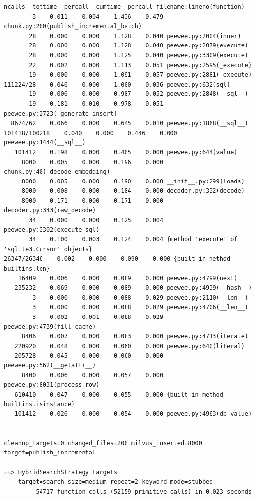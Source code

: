 \documentclass[a4paper,12pt]{article}
\begin{document}
\begin{lstlisting}[basicstyle=\ttfamily\fontsize{9}{9}\selectfont]
   ncalls  tottime  percall  cumtime  percall filename:lineno(function)
        3    0.011    0.004    1.436    0.479 chunk.py:200(publish_incremental_batch)
       28    0.000    0.000    1.128    0.040 peewee.py:2004(inner)
       28    0.000    0.000    1.128    0.040 peewee.py:2079(execute)
       28    0.000    0.000    1.125    0.040 peewee.py:3309(execute)
       22    0.002    0.000    1.113    0.051 peewee.py:2595(_execute)
       19    0.000    0.000    1.091    0.057 peewee.py:2881(_execute)
111224/28    0.046    0.000    1.000    0.036 peewee.py:632(sql)
       19    0.006    0.000    0.987    0.052 peewee.py:2848(__sql__)
       19    0.181    0.010    0.978    0.051 peewee.py:2723(_generate_insert)
  8674/62    0.066    0.000    0.645    0.010 peewee.py:1868(__sql__)
101418/100218    0.040    0.000    0.446    0.000 peewee.py:1444(__sql__)
   101412    0.198    0.000    0.405    0.000 peewee.py:644(value)
     8000    0.005    0.000    0.196    0.000 chunk.py:40(_decode_embedding)
     8000    0.005    0.000    0.190    0.000 __init__.py:299(loads)
     8000    0.008    0.000    0.184    0.000 decoder.py:332(decode)
     8000    0.171    0.000    0.171    0.000 decoder.py:343(raw_decode)
       34    0.000    0.000    0.125    0.004 peewee.py:3302(execute_sql)
       34    0.100    0.003    0.124    0.004 {method 'execute' of 'sqlite3.Cursor' objects}
26347/26346    0.002    0.000    0.090    0.000 {built-in method builtins.len}
    16409    0.006    0.000    0.089    0.000 peewee.py:4799(next)
   235232    0.069    0.000    0.089    0.000 peewee.py:4939(__hash__)
        3    0.000    0.000    0.088    0.029 peewee.py:2110(__len__)
        3    0.000    0.000    0.088    0.029 peewee.py:4706(__len__)
        3    0.002    0.001    0.088    0.029 peewee.py:4739(fill_cache)
     8406    0.007    0.000    0.083    0.000 peewee.py:4713(iterate)
   220920    0.048    0.000    0.060    0.000 peewee.py:640(literal)
   205728    0.045    0.000    0.060    0.000 peewee.py:562(__getattr__)
     8400    0.006    0.000    0.057    0.000 peewee.py:8031(process_row)
   610410    0.047    0.000    0.055    0.000 {built-in method builtins.isinstance}
   101412    0.026    0.000    0.054    0.000 peewee.py:4963(db_value)


cleanup_targets=0 changed_files=200 milvus_inserted=8000 target=publish_incremental

==> HybridSearchStrategy targets
--- target=search size=medium repeat=2 keyword_mode=stubbed ---
         54717 function calls (52159 primitive calls) in 0.023 seconds


\end{lstlisting}
\end{document}
